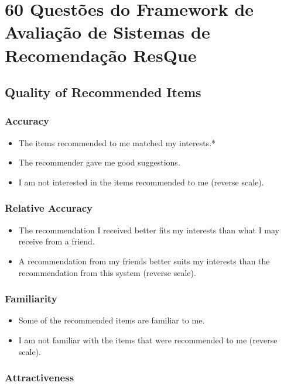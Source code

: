 \chapter{60 Questões do Framework de Avaliação de Sistemas de Recomendação ResQue}\label{ane:questoes-framework}

\section{Quality of Recommended Items}

\subsection{Accuracy}

\begin{itemize}
\item The items recommended to me matched my interests.*
\item The recommender gave me good suggestions.
\item I am not interested in the items recommended to me (reverse scale).
\end{itemize}

\subsection{Relative Accuracy}

\begin{itemize}
\item The recommendation I received better fits my interests than what I may receive from a friend.
\item A recommendation from my friends better suits my interests than the recommendation from this system (reverse scale).
\end{itemize}

\subsection{Familiarity}

\begin{itemize}
\item Some of the recommended items are familiar to me.
\item I am not familiar with the items that were recommended to me (reverse scale).
\end{itemize}

\subsection{Attractiveness}

